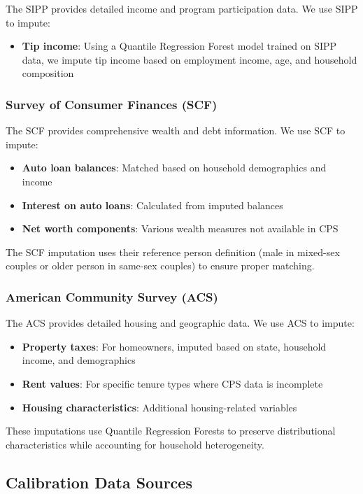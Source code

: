 The SIPP provides detailed income and program participation data. We use SIPP to impute:
\begin{itemize}
\item \textbf{Tip income}: Using a Quantile Regression Forest model trained on SIPP data, we impute tip income based on employment income, age, and household composition
\end{itemize}

\subsubsection{Survey of Consumer Finances (SCF)}

The SCF provides comprehensive wealth and debt information. We use SCF to impute:
\begin{itemize}
\item \textbf{Auto loan balances}: Matched based on household demographics and income
\item \textbf{Interest on auto loans}: Calculated from imputed balances
\item \textbf{Net worth components}: Various wealth measures not available in CPS
\end{itemize}

The SCF imputation uses their reference person definition (male in mixed-sex couples or older person in same-sex couples) to ensure proper matching.

\subsubsection{American Community Survey (ACS)}

The ACS provides detailed housing and geographic data. We use ACS to impute:
\begin{itemize}
\item \textbf{Property taxes}: For homeowners, imputed based on state, household income, and demographics
\item \textbf{Rent values}: For specific tenure types where CPS data is incomplete
\item \textbf{Housing characteristics}: Additional housing-related variables
\end{itemize}

These imputations use Quantile Regression Forests to preserve distributional characteristics while accounting for household heterogeneity.

\subsection{Calibration Data Sources}

